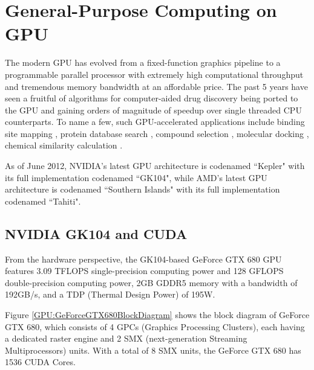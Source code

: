 \section{General-Purpose Computing on GPU}

The modern GPU has evolved from a fixed-function graphics pipeline to a programmable parallel processor with extremely high computational throughput and tremendous memory bandwidth at an affordable price. The past 5 years have seen a fruitful of algorithms for computer-aided drug discovery being ported to the GPU and gaining orders of magnitude of speedup over single threaded CPU counterparts. To name a few, such GPU-accelerated applications include binding site mapping \citep{722}, protein database search \citep{189}, compound selection \citep{750}, molecular docking \citep{723,652,779}, chemical similarity calculation \citep{726}.

As of June 2012, NVIDIA’s latest GPU architecture is codenamed ``Kepler" with its full implementation codenamed ``GK104", while AMD's latest GPU architecture is codenamed ``Southern Islands" with its full implementation codenamed ``Tahiti".

\subsection{NVIDIA GK104 and CUDA}

From the hardware perspective, the GK104-based GeForce GTX 680 GPU features 3.09 TFLOPS single-precision computing power and 128 GFLOPS double-precision computing power, 2GB GDDR5 memory with a bandwidth of 192GB/s, and a TDP (Thermal Design Power) of 195W.

Figure \ref{GPU:GeForceGTX680BlockDiagram} shows the block diagram of GeForce GTX 680, which consists of 4 GPCs (Graphics Processing Clusters), each having a dedicated raster engine and 2 SMX (next-generation Streaming Multiprocessors) units. With a total of 8 SMX units, the GeForce GTX 680 has 1536 CUDA Cores.

